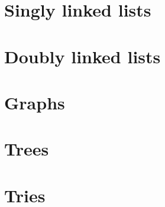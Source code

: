 \section{Singly linked lists}



\section{Doubly linked lists}


\section{Graphs}

\section{Trees}

\section{Tries}